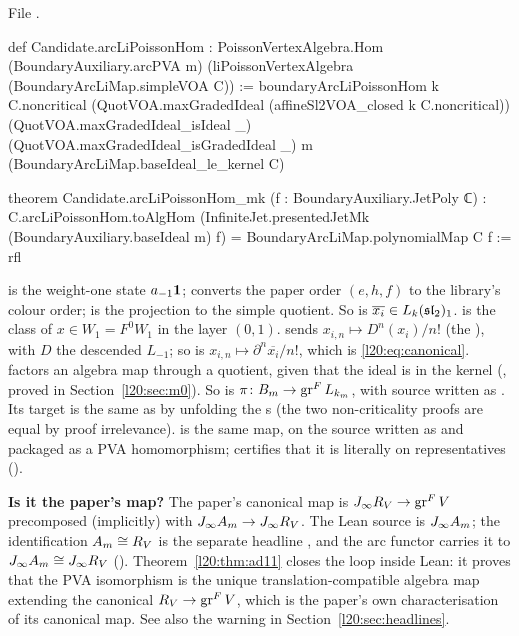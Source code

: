 \noindent File .
\begin{leancode}
def Candidate.arcLiPoissonHom :
    PoissonVertexAlgebra.Hom (BoundaryAuxiliary.arcPVA m)
      (liPoissonVertexAlgebra (BoundaryArcLiMap.simpleVOA C)) :=
  boundaryArcLiPoissonHom k C.noncritical
    (QuotVOA.maxGradedIdeal (affineSl2VOA_closed k C.noncritical))
    (QuotVOA.maxGradedIdeal_isIdeal _) (QuotVOA.maxGradedIdeal_isGradedIdeal _)
    m (BoundaryArcLiMap.baseIdeal_le_kernel C)

theorem Candidate.arcLiPoissonHom_mk (f : BoundaryAuxiliary.JetPoly ℂ) :
    C.arcLiPoissonHom.toAlgHom (InfiniteJet.presentedJetMk (BoundaryAuxiliary.baseIdeal m) f) =
      BoundaryArcLiMap.polynomialMap C f := rfl
\end{leancode}

\begin{dictionary}
 is the weight-one state $a_{-1}\mathbf{1}$;  converts the
paper order $(e,h,f)$ to the library's colour order;  is the projection to the simple quotient. So
 is $\overline{x_i}\in L_k(\mathfrak{sl}_2)_1$.  is the class of
$x\in W_1=F^0W_1$ in the layer $(0,1)$.  sends $x_{i,n}\mapsto D^n(x_i)/n!$ (the
), with $D$ the descended $L_{-1}$; so  is
$x_{i,n}\mapsto\partial^n\overline{x_i}/n!$, which is \eqref{l20:eq:canonical}.  factors
an algebra map through a quotient, given that the ideal is in the kernel (, proved
in Section~\ref{l20:sec:m0}). So  is $\pi\colon B_m\to\operatorname{gr}^F L_{k_m}$, with source
written as . Its target  is the
same as  by unfolding the s (the two
non-criticality proofs are equal by proof irrelevance).  is the same map, on the
source written as  and packaged as a PVA homomorphism;  certifies
that it is literally  on representatives ().

\textbf{Is it the paper's map?} The paper's canonical map is
$J_\infty R_V\to\operatorname{gr}^F V$ precomposed (implicitly) with $J_\infty A_m\to J_\infty R_V$. The Lean source is
$J_\infty A_m$; the identification $A_m\cong R_V$ is the separate headline , and
the arc functor carries it to $J_\infty A_m\cong J_\infty R_V$ (). Theorem~\ref{l20:thm:ad11}
closes the loop inside Lean: it proves that the PVA isomorphism is the unique translation-compatible algebra map
extending the canonical $R_V\to\operatorname{gr}^F V$, which is the paper's own characterisation of its canonical map. See also
the warning in Section~\ref{l20:sec:headlines}.
\end{dictionary}

